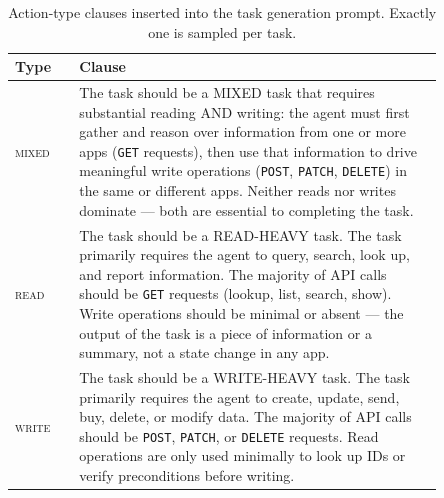 \begin{table}[t]
\centering
\small
\renewcommand{\arraystretch}{1.3}
\begin{tabular}{l p{0.85\linewidth}}
\toprule
\textbf{Type} & \textbf{Clause} \\
\midrule
\textsc{mixed} & The task should be a MIXED task that requires substantial reading AND writing: the agent must first gather and reason over information from one or more apps (\texttt{GET} requests), then use that information to drive meaningful write operations (\texttt{POST}, \texttt{PATCH}, \texttt{DELETE}) in the same or different apps. Neither reads nor writes dominate --- both are essential to completing the task. \\
\midrule
\textsc{read}  & The task should be a READ-HEAVY task. The task primarily requires the agent to query, search, look up, and report information. The majority of API calls should be \texttt{GET} requests (lookup, list, search, show). Write operations should be minimal or absent --- the output of the task is a piece of information or a summary, not a state change in any app. \\
\midrule
\textsc{write} & The task should be a WRITE-HEAVY task. The task primarily requires the agent to create, update, send, buy, delete, or modify data. The majority of API calls should be \texttt{POST}, \texttt{PATCH}, or \texttt{DELETE} requests. Read operations are only used minimally to look up IDs or verify preconditions before writing. \\
\bottomrule
\end{tabular}
\caption{Action-type clauses inserted into the task generation prompt. Exactly one is sampled per task.}
\label{tab:taskgen_action}
\end{table}


